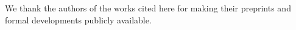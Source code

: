
We thank the authors of the works cited here for making their preprints and formal developments publicly available.
